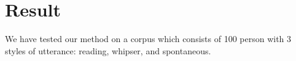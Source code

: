 \section{Result}
We have tested our method on a corpus which consists of 100 person with 3 styles of utterance:
reading, whipser, and spontaneous.


